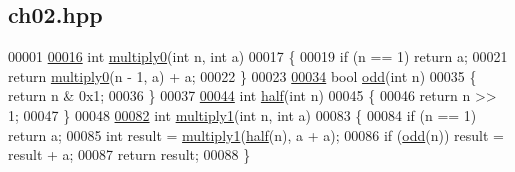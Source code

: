 \hypertarget{ch02_8hpp_source}{}\subsection{ch02.\+hpp}

\begin{DoxyCode}
00001 
\hypertarget{ch02_8hpp_source.tex_l00016}{}\hyperlink{ch02_8hpp_a7884c00903a67beac160ef1dbac5aadb}{00016} \textcolor{keywordtype}{int} \hyperlink{ch02_8hpp_a7884c00903a67beac160ef1dbac5aadb}{multiply0}(\textcolor{keywordtype}{int} n, \textcolor{keywordtype}{int} a)
00017 \{
00019   \textcolor{keywordflow}{if} (n == 1) \textcolor{keywordflow}{return} a;
00021   \textcolor{keywordflow}{return} \hyperlink{ch02_8hpp_a7884c00903a67beac160ef1dbac5aadb}{multiply0}(n - 1, a) + a;
00022 \}
00023 
\hypertarget{ch02_8hpp_source.tex_l00034}{}\hyperlink{ch02_8hpp_a332ce27d3420d4e8434d6bfc7a7795cd}{00034} \textcolor{keywordtype}{bool} \hyperlink{ch02_8hpp_a332ce27d3420d4e8434d6bfc7a7795cd}{odd}(\textcolor{keywordtype}{int} n)
00035 \{ \textcolor{keywordflow}{return} n & 0x1;
00036 \}
00037 
\hypertarget{ch02_8hpp_source.tex_l00044}{}\hyperlink{ch02_8hpp_a11862a5d46925d507a569ca5a5883168}{00044} \textcolor{keywordtype}{int} \hyperlink{ch02_8hpp_a11862a5d46925d507a569ca5a5883168}{half}(\textcolor{keywordtype}{int} n)
00045 \{
00046   \textcolor{keywordflow}{return} n >> 1;
00047 \}
00048 
\hypertarget{ch02_8hpp_source.tex_l00082}{}\hyperlink{ch02_8hpp_a48a38063c9bdb0bf915285f28e412a7f}{00082} \textcolor{keywordtype}{int} \hyperlink{ch02_8hpp_a48a38063c9bdb0bf915285f28e412a7f}{multiply1}(\textcolor{keywordtype}{int} n, \textcolor{keywordtype}{int} a)
00083 \{
00084   \textcolor{keywordflow}{if} (n == 1) \textcolor{keywordflow}{return} a;
00085   \textcolor{keywordtype}{int} result = \hyperlink{ch02_8hpp_a48a38063c9bdb0bf915285f28e412a7f}{multiply1}(\hyperlink{ch02_8hpp_a11862a5d46925d507a569ca5a5883168}{half}(n), a + a);
00086   \textcolor{keywordflow}{if} (\hyperlink{ch02_8hpp_a332ce27d3420d4e8434d6bfc7a7795cd}{odd}(n)) result = result + a;
00087   \textcolor{keywordflow}{return} result;
00088 \}
\end{DoxyCode}
